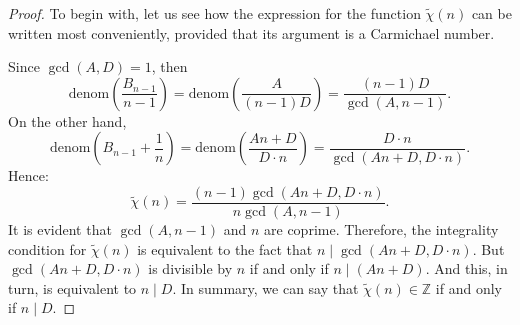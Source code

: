\documentclass[reqno,a4paper,11pt]{amsart}
\numberwithin{equation}{section}
\theoremstyle{definition}
\begin{document}
\begin{proof}
To begin with, let us see how the expression for the function $\tilde{\chi}(n)$ can be written most conveniently, provided that its argument is a Carmichael number. 

Since $\gcd(A, D)=1$, then 
\[
\mathrm{denom}\left(\displaystyle\frac{B_{n-1}}{n-1}\right)=\mathrm{denom}\left(\displaystyle \frac{A}{(n-1) D}\right)=\frac{ \left(n-1\right)D}{\gcd(A,  n-1)}.
\]
On the other hand,
\[
\mathrm{denom}\left(\displaystyle B_{n-1}+\frac{1}{n}\right)=\mathrm{denom}\left(\displaystyle \frac{An+D}{D\cdot n}\right)=\frac{D\cdot n}{\gcd(An+D,  D\cdot n)}.
\]
Hence:
\[
\tilde{\chi}(n)=\frac{(n-1)\gcd(An+D, D\cdot n)}{n\gcd(A, n-1)}.
\]
It is evident that $\gcd(A, n-1)$ and $n$ are coprime. Therefore, the integrality condition for $\tilde{\chi}(n)$ is equivalent to the fact that $n \mid \gcd\left(An+D, D\cdot n\right)$. But $\gcd\left(An+D, D\cdot n\right)$ is divisible by $n$ if and only if $n\mid \left(An+D\right)$. And this, in turn, is equivalent to  $n\mid D$. 
In summary, we can say that $\tilde{\chi}(n)\in\mathbb{Z}$ if and only if $n\mid D$. 
\end{proof}
\end{document}
